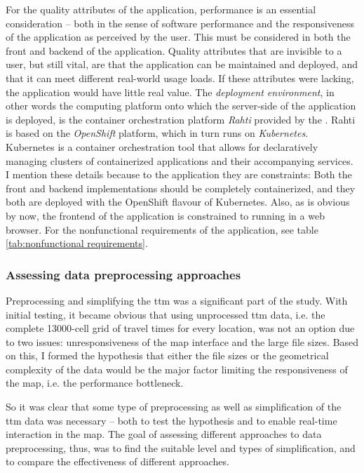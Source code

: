 For the quality attributes of the application,
performance is an essential consideration --
both in the sense of software performance
and the responsiveness of the application as perceived by the user.
This must be considered in both the front and backend of the application.
Quality attributes that are invisible to a user, but still vital,
are that the application can be maintained and deployed,
and that it can meet different real-world usage loads.
If these attributes were lacking,
the application would have little real value.
The \textit{deployment environment},
in other words the computing platform onto which the server-side of the application is deployed,
is the container orchestration platform \textit{Rahti} provided by the .
Rahti is based on the \textit{OpenShift} platform,
which in turn runs on \textit{Kubernetes}.
Kubernetes is a container orchestration tool
that allows for declaratively managing clusters
of containerized applications and their accompanying services.
I mention these details because to the application they are constraints:
Both the front and backend implementations should be completely containerized,
and they both are deployed with the OpenShift flavour of Kubernetes.
Also, as is obvious by now,
the frontend of the application is constrained to running in a web browser.
For the nonfunctional requirements of the application,
see table \ref{tab:nonfunctional requirements}.




\subsubsection{Assessing data preprocessing approaches}
Preprocessing and simplifying the \acrshort{ttm} was a significant part of the study.
With initial testing,
it became obvious that
using unprocessed \acrshort{ttm} data,
i.e. the complete 13000-cell grid of travel times for every location,
was not an option due to two issues:
unresponsiveness of the map interface and the large file sizes.
Based on this,
I formed the hypothesis that either the file sizes
or the geometrical complexity of the data would be
the major factor limiting the responsiveness of the map,
i.e. the performance bottleneck.

So it was clear that
some type of preprocessing as well as simplification of the 
\acrshort{ttm} data was necessary --
both to test the hypothesis and to enable real-time interaction in the map.
The goal of assessing different approaches to data preprocessing, thus,
was to find the suitable level and types of simplification,
and to compare the effectiveness of different approaches.

